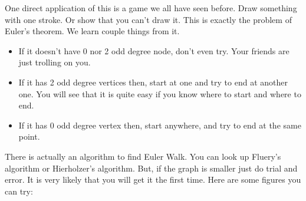 \documentclass[a4paper, 12pt]{article}
\begin{document}
	One direct application of this is a game we all have seen before. Draw something with one stroke. Or show that you can't draw it. This is exactly the problem of Euler's theorem. We learn couple things from it.
	\begin{itemize}
		\item If it doesn't have 0 nor 2 odd degree node, don't even try. Your friends are just trolling on you.
		\item If it has 2 odd degree vertices then, start at one and try to end at another one. You will see that it is quite easy if you know where to start and where to end.
		\item If it has 0 odd degree vertex then, start anywhere, and try to end at the same point.
	\end{itemize}
	
	There is actually an algorithm to find Euler Walk. You can look up Fluery's algorithm or Hierholzer's algorithm. But, if the graph is smaller just do trial and error. It is very likely that you will get it the first time. Here are some figures you can try:
	
	\begin{center}
	\end{center}
		
\end{document}
